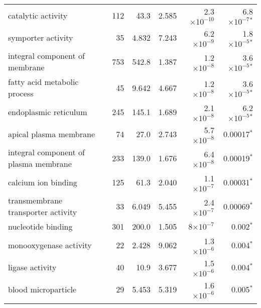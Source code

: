\begin{longtable}{|l|r|r|r|r|r|}
                                catalytic activity &                     112 &                    43.3 &      2.585 & 2.3$\times 10^{-10}$ &   6.8$\times 10^{-7}$$\bm{^*}$ \\
                                symporter activity &                      35 &                   4.832 &      7.243 &  6.2$\times 10^{-9}$ &   1.8$\times 10^{-5}$$\bm{^*}$ \\
                    integral component of membrane &                     753 &                   542.8 &      1.387 &  1.2$\times 10^{-8}$ &   3.6$\times 10^{-5}$$\bm{^*}$ \\
                      fatty acid metabolic process &                      45 &                   9.642 &      4.667 &  1.2$\times 10^{-8}$ &   3.6$\times 10^{-5}$$\bm{^*}$ \\
                             endoplasmic reticulum &                     245 &                   145.1 &      1.689 &  2.1$\times 10^{-8}$ &   6.2$\times 10^{-5}$$\bm{^*}$ \\
                            apical plasma membrane &                      74 &                    27.0 &      2.743 &  5.7$\times 10^{-8}$ &               0.00017$\bm{^*}$ \\
             integral component of plasma membrane &                     233 &                   139.0 &      1.676 &  6.4$\times 10^{-8}$ &               0.00019$\bm{^*}$ \\
                               calcium ion binding &                     125 &                    61.3 &      2.040 &  1.1$\times 10^{-7}$ &               0.00031$\bm{^*}$ \\
                transmembrane transporter activity &                      33 &                   6.049 &      5.455 &  2.4$\times 10^{-7}$ &               0.00069$\bm{^*}$ \\
                                nucleotide binding &                     301 &                   200.0 &      1.505 &    8$\times 10^{-7}$ &                 0.002$\bm{^*}$ \\
                            monooxygenase activity &                      22 &                   2.428 &      9.062 &  1.3$\times 10^{-6}$ &                 0.004$\bm{^*}$ \\
                                   ligase activity &                      40 &                    10.9 &      3.677 &  1.5$\times 10^{-6}$ &                 0.004$\bm{^*}$ \\
                               blood microparticle &                      29 &                   5.453 &      5.319 &  1.6$\times 10^{-6}$ &                 0.005$\bm{^*}$ \\
$$
\end{longtable}
